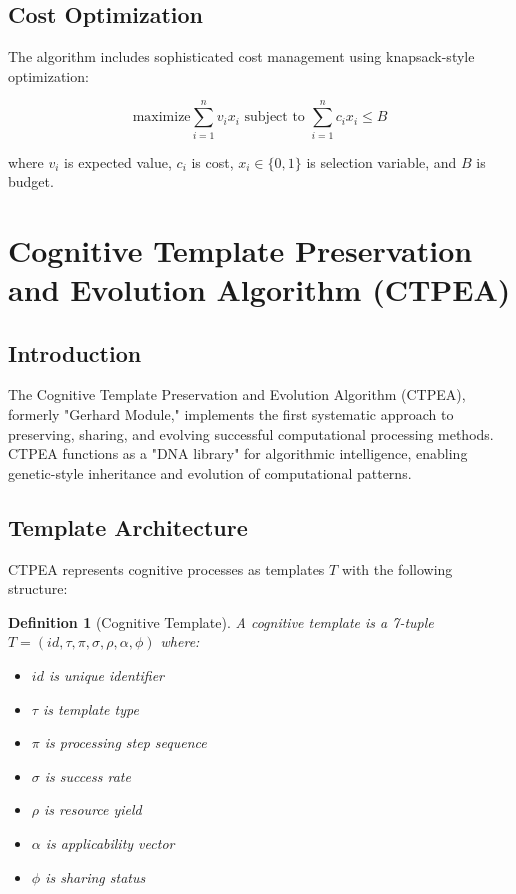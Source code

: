 \documentclass[12pt,a4paper]{article}
\newtheorem{definition}[theorem]{Definition}
\begin{document}
\subsection{Cost Optimization}

The algorithm includes sophisticated cost management using knapsack-style optimization:

\begin{equation}
\text{maximize} \sum_{i=1}^{n} v_i x_i \text{ subject to } \sum_{i=1}^{n} c_i x_i \leq B
\end{equation}

where $v_i$ is expected value, $c_i$ is cost, $x_i \in \{0,1\}$ is selection variable, and $B$ is budget.

\section{Cognitive Template Preservation and Evolution Algorithm (CTPEA)}

\subsection{Introduction}

The Cognitive Template Preservation and Evolution Algorithm (CTPEA), formerly "Gerhard Module," implements the first systematic approach to preserving, sharing, and evolving successful computational processing methods. CTPEA functions as a "DNA library" for algorithmic intelligence, enabling genetic-style inheritance and evolution of computational patterns.

\subsection{Template Architecture}

CTPEA represents cognitive processes as templates $T$ with the following structure:

\begin{definition}[Cognitive Template]
A cognitive template is a 7-tuple $T = (id, \tau, \pi, \sigma, \rho, \alpha, \phi)$ where:
\begin{itemize}
\item $id$ is unique identifier
\item $\tau$ is template type
\item $\pi$ is processing step sequence
\item $\sigma$ is success rate
\item $\rho$ is resource yield
\item $\alpha$ is applicability vector
\item $\phi$ is sharing status
\end{itemize}
\end{definition}
\end{document}
